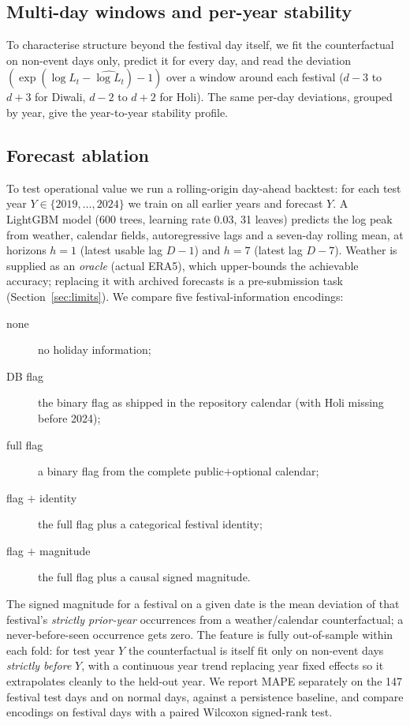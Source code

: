 \documentclass[11pt]{article}
\begin{document}
\subsection{Multi-day windows and per-year stability}

To characterise structure beyond the festival day itself, we fit the
counterfactual on non-event days only, predict it for every day, and read the
deviation $(\exp(\log L_t - \widehat{\log L_t})-1)$ over a window around each
festival ($d{-}3$ to $d{+}3$ for Diwali, $d{-}2$ to $d{+}2$ for Holi). The same
per-day deviations, grouped by year, give the year-to-year stability profile.

\subsection{Forecast ablation}
\label{sec:method-ablation}

To test operational value we run a rolling-origin day-ahead backtest: for each
test year $Y \in \{2019,\dots,2024\}$ we train on all earlier years and forecast
$Y$. A LightGBM model (600 trees, learning rate $0.03$, 31 leaves) predicts the
log peak from weather, calendar fields, autoregressive lags and a seven-day
rolling mean, at horizons $h=1$ (latest usable lag $D{-}1$) and $h=7$ (latest lag
$D{-}7$). Weather is supplied as an \emph{oracle} (actual ERA5), which upper-bounds
the achievable accuracy; replacing it with archived forecasts is a pre-submission
task (Section~\ref{sec:limits}). We compare five festival-information encodings:

\begin{description}
\item[none] no holiday information;
\item[DB flag] the binary flag as shipped in the repository calendar (with Holi
  missing before 2024);
\item[full flag] a binary flag from the complete public$+$optional calendar;
\item[flag $+$ identity] the full flag plus a categorical festival identity;
\item[flag $+$ magnitude] the full flag plus a causal signed magnitude.
\end{description}

The signed magnitude for a festival on a given date is the mean deviation of that
festival's \emph{strictly prior-year} occurrences from a weather/calendar
counterfactual; a never-before-seen occurrence gets zero. The feature is fully
out-of-sample within each fold: for test year $Y$ the counterfactual is itself
fit only on non-event days \emph{strictly before} $Y$, with a continuous year
trend replacing year fixed effects so it extrapolates cleanly to the held-out
year. We report MAPE separately on the 147 festival test days and on normal days,
against a persistence baseline, and compare encodings on festival days with a
paired Wilcoxon signed-rank test.
\end{document}
